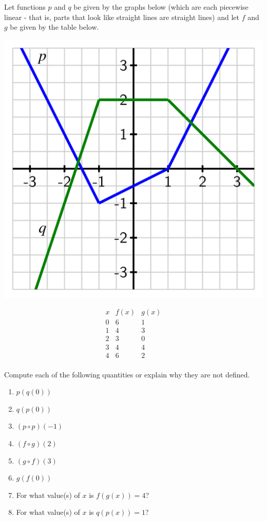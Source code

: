 \documentclass{ximera}
\begin{document}
\begin{exploration}
Let functions $p$ and $q$ be given by the graphs below (which are each piecewise linear - that is, parts that look like straight lines are straight lines) and let $f$ and $g$ be given by the table below.

\begin{image}
\includegraphics[width=.7\textwidth]{composite-act-graphs.jpg}
\end{image}

$$
\begin{array}{c|c|c}
x&f(x)&g(x)\\
\hline
0&6&1\\
1&4&3\\
2&3&0\\
3&4&4\\
4&6&2\\
\end{array}
$$

Compute each of the following quantities or explain why they are not defined.

\begin{enumerate}[label=\alph*.]
\item $p(q(0))$
\item $q(p(0))$
\item $(p \circ p)(-1)$
\item $(f \circ g)(2)$
\item$(g \circ f)(3)$
\item $g(f(0))$
\item For what value(s) of $x$ is $f(g(x)) = 4$?
\item For what value(s) of $x$ is $q(p(x)) = 1$?
\end{enumerate}
\end{exploration}
\end{document}
